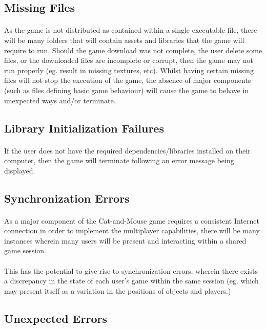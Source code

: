 \documentclass[12pt, titlepage]{article}
\begin{document}
\subsection{Missing Files}
\paragraph{}As the game is not distributed as contained within a single executable file, there will be many folders that will contain assets and libraries that the game will require to run. Should the game download was not complete, the user delete some files, or the downloaded files are incomplete or corrupt, then the game may not run properly (eg. result in missing textures, etc). Whilst having certain missing files will not stop the execution of the game, the absence of major components (such as files defining basic game behaviour) will cause the game to behave in unexpected ways and/or terminate.
\subsection{Library Initialization Failures}
\paragraph{}If the user does not have the required dependencies/libraries installed on their computer, then the game will terminate following an error message being displayed.
\subsection{Synchronization Errors}
\paragraph{}As a major component of the Cat-and-Mouse game requires a consistent Internet connection in order to implement the multiplayer capabilities, there will be many instances wherein many users will be present and interacting within a shared game session.
\paragraph{}This has the potential to give rise to synchronization errors, wherein there exists a discrepancy in the state of each user's game within the same session (eg. which may present itself as a variation in the positions of objects and players.)
\subsection{Unexpected Errors}
\end{document}
